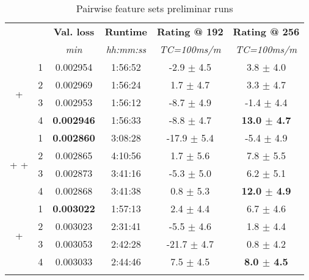 
    \begin{table}[H]
\caption{Pairwise feature sets preliminar runs}
\centering
\begin{adjustbox}{center}
\begin{tabular}{@{} cccc|cc @{}}
\toprule
\bf {} & \bf {} & \bf Val. loss & \bf Runtime & \bf Rating @ 192 & \bf Rating @ 256 \\
 &  & \textit{min} & \textit{hh:mm:ss} & \textit{TC=100ms/m} & \textit{TC=100ms/m} \\
\midrule
     & 1 & 0.002954 & 1:56:52 & -2.9 $\pm$ 4.5 & 3.8 $\pm$ 4.0\\
 & 2 & 0.002969 & 1:56:24 & 1.7 $\pm$ 4.7 & 3.3 $\pm$ 4.7\\
 & 3 & 0.002953 & 1:56:12 & -8.7 $\pm$ 4.9 & -1.4 $\pm$ 4.4\\
 & 4 & \bf0.002946 & 1:56:33 & -8.8 $\pm$ 4.7 & \bf13.0 $\pm$ 4.7\\
\midrule
{} & 1 & \bf0.002860 & 3:08:28 & -17.9 $\pm$ 5.4 & -5.4 $\pm$ 4.9\\
 & 2 & 0.002865 & 4:10:56 & 1.7 $\pm$ 5.6 & 7.8 $\pm$ 5.5\\
 & 3 & 0.002873 & 3:41:16 & -5.3 $\pm$ 5.0 & 6.2 $\pm$ 5.1\\
 & 4 & 0.002868 & 3:41:38 & 0.8 $\pm$ 5.3 & \bf12.0 $\pm$ 4.9\\
\midrule
{} & 1 & \bf0.003022 & 1:57:13 & 2.4 $\pm$ 4.4 & 6.7 $\pm$ 4.6\\
 & 2 & 0.003023 & 2:31:41 & -5.5 $\pm$ 4.6 & 1.8 $\pm$ 4.4\\
 & 3 & 0.003053 & 2:42:28 & -21.7 $\pm$ 4.7 & 0.8 $\pm$ 4.2\\
 & 4 & 0.003033 & 2:44:46 & 7.5 $\pm$ 4.5 & \bf8.0 $\pm$ 4.5\\
\toprule
{} \\
\end{tabular}
\end{adjustbox}
\end{table}
